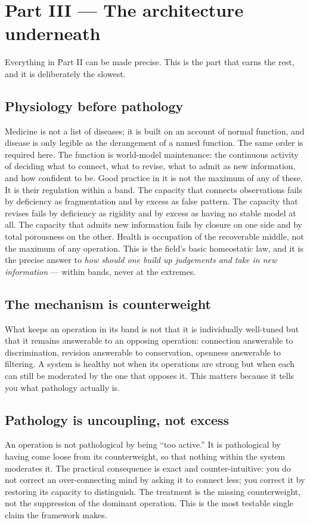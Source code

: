 \documentclass{article}
\begin{document}
\section*{Part III --- The architecture underneath}

Everything in Part II can be made precise. This is the part that earns the rest, and it is deliberately the slowest.

\subsection*{Physiology before pathology}
Medicine is not a list of diseases; it is built on an account of normal function, and disease is only legible as the derangement of a named function. The same order is required here. The function is world-model maintenance: the continuous activity of deciding what to connect, what to revise, what to admit as new information, and how confident to be. Good practice in it is not the maximum of any of these. It is their regulation within a band. The capacity that connects observations fails by deficiency as fragmentation and by excess as false pattern. The capacity that revises fails by deficiency as rigidity and by excess as having no stable model at all. The capacity that admits new information fails by closure on one side and by total porousness on the other. Health is occupation of the recoverable middle, not the maximum of any operation. This is the field's basic homeostatic law, and it is the precise answer to \textit{how should one build up judgements and take in new information} --- within bands, never at the extremes.

\subsection*{The mechanism is counterweight}
What keeps an operation in its band is not that it is individually well-tuned but that it remains answerable to an opposing operation: connection answerable to discrimination, revision answerable to conservation, openness answerable to filtering. A system is healthy not when its operations are strong but when each can still be moderated by the one that opposes it. This matters because it tells you what pathology actually is.

\subsection*{Pathology is uncoupling, not excess}
An operation is not pathological by being ``too active.'' It is pathological by having come loose from its counterweight, so that nothing within the system moderates it. The practical consequence is exact and counter-intuitive: you do not correct an over-connecting mind by asking it to connect less; you correct it by restoring its capacity to distinguish. The treatment is the missing counterweight, not the suppression of the dominant operation. This is the most testable single claim the framework makes.
\end{document}

